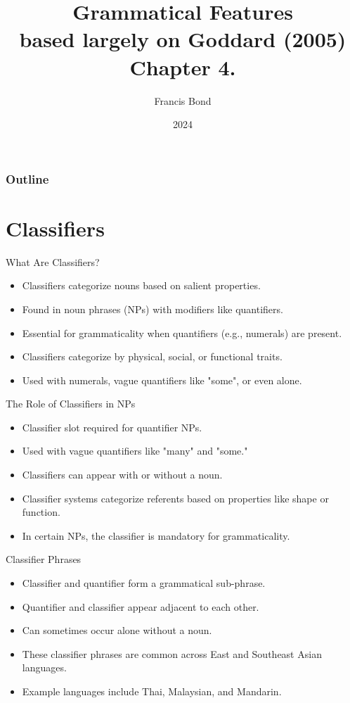 \documentclass{beamer}
\title[Grammar]{Grammatical Features\\ based largely on Goddard (2005) Chapter 4.}
\author[Francis Bond]{Francis Bond}
\date{2024}
\begin{document}
  \frame{\titlepage}

  \begin{frame}
    \frametitle{Outline}
    \tableofcontents
\end{frame}

\section{Classifiers}


\begin{frame}{What Are Classifiers?}
\begin{itemize}
    \item Classifiers categorize nouns based on salient properties.
    \item Found in noun phrases (NPs) with modifiers like quantifiers.
    \item Essential for grammaticality when quantifiers (e.g., numerals) are present.
    \item Classifiers categorize by physical, social, or functional traits.
    \item Used with numerals, vague quantifiers like "some", or even alone.
\end{itemize}
\end{frame}

\begin{frame}{The Role of Classifiers in NPs}
\begin{itemize}
    \item Classifier slot required for quantifier NPs.
    \item Used with vague quantifiers like "many" and "some."
    \item Classifiers can appear with or without a noun.
    \item Classifier systems categorize referents based on properties like shape or function.
    \item In certain NPs, the classifier is mandatory for grammaticality.
\end{itemize}
\end{frame}

\begin{frame}{Classifier Phrases}
\begin{itemize}
    \item Classifier and quantifier form a grammatical sub-phrase.
    \item Quantifier and classifier appear adjacent to each other.
    \item Can sometimes occur alone without a noun.
    \item These classifier phrases are common across East and Southeast Asian languages.
    \item Example languages include Thai, Malaysian, and Mandarin.
\end{itemize}
\end{frame}
\end{document}
